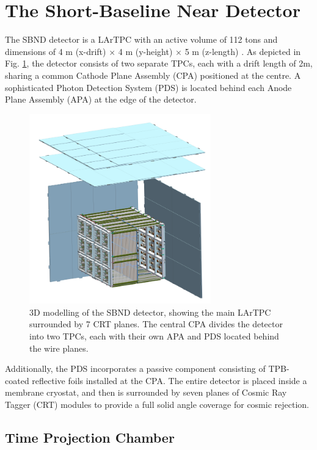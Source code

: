 \section{The Short-Baseline Near Detector}

The SBND detector is a LArTPC with an active volume of 112 tons and dimensions of 4 m (x-drift) $\times$ 4 m (y-height) $\times$ 5 m (z-length) \cite{SBNProposal}.
As depicted in Fig. \ref{fig:SBND_Pretty}, the detector consists of two separate TPCs, each with a drift length of 2m, sharing a common Cathode Plane Assembly (CPA) positioned at the centre.
A sophisticated Photon Detection System (PDS) is located behind each Anode Plane Assembly (APA) at the edge of the detector.
\begin{figure}[htbp] 
\centering    
\includegraphics[width=0.70\textwidth]{SBND_Pretty}
\caption[SBND_Pretty]{
3D modelling of the SBND detector, showing the main LArTPC surrounded by 7 CRT planes.
The central CPA divides the detector into two TPCs, each with their own APA and PDS located behind the wire planes.
}
\label{fig:SBND_Pretty}
\end{figure}
Additionally, the PDS incorporates a passive component consisting of TPB-coated reflective foils installed at the CPA.
The entire detector is placed inside a membrane cryostat, and then is surrounded by seven planes of Cosmic Ray Tagger (CRT) modules to provide a full solid angle coverage for cosmic rejection.

\subsection{Time Projection Chamber}

